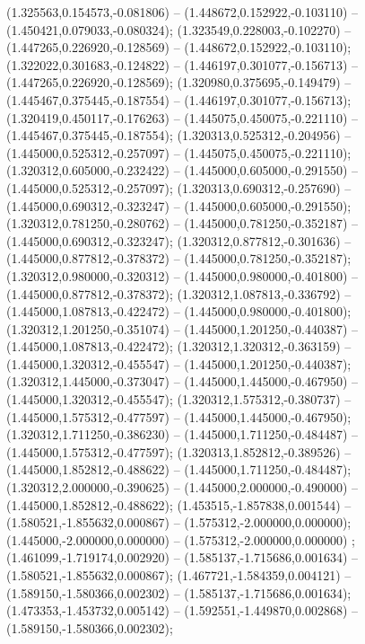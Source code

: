  (1.325563,0.154573,-0.081806) -- (1.448672,0.152922,-0.103110) -- (1.450421,0.079033,-0.080324);
 (1.323549,0.228003,-0.102270) -- (1.447265,0.226920,-0.128569) -- (1.448672,0.152922,-0.103110);
 (1.322022,0.301683,-0.124822) -- (1.446197,0.301077,-0.156713) -- (1.447265,0.226920,-0.128569);
 (1.320980,0.375695,-0.149479) -- (1.445467,0.375445,-0.187554) -- (1.446197,0.301077,-0.156713);
 (1.320419,0.450117,-0.176263) -- (1.445075,0.450075,-0.221110) -- (1.445467,0.375445,-0.187554);
 (1.320313,0.525312,-0.204956) -- (1.445000,0.525312,-0.257097) -- (1.445075,0.450075,-0.221110);
 (1.320312,0.605000,-0.232422) -- (1.445000,0.605000,-0.291550) -- (1.445000,0.525312,-0.257097);
 (1.320313,0.690312,-0.257690) -- (1.445000,0.690312,-0.323247) -- (1.445000,0.605000,-0.291550);
 (1.320312,0.781250,-0.280762) -- (1.445000,0.781250,-0.352187) -- (1.445000,0.690312,-0.323247);
 (1.320312,0.877812,-0.301636) -- (1.445000,0.877812,-0.378372) -- (1.445000,0.781250,-0.352187);
 (1.320312,0.980000,-0.320312) -- (1.445000,0.980000,-0.401800) -- (1.445000,0.877812,-0.378372);
 (1.320312,1.087813,-0.336792) -- (1.445000,1.087813,-0.422472) -- (1.445000,0.980000,-0.401800);
 (1.320312,1.201250,-0.351074) -- (1.445000,1.201250,-0.440387) -- (1.445000,1.087813,-0.422472);
 (1.320312,1.320312,-0.363159) -- (1.445000,1.320312,-0.455547) -- (1.445000,1.201250,-0.440387);
 (1.320312,1.445000,-0.373047) -- (1.445000,1.445000,-0.467950) -- (1.445000,1.320312,-0.455547);
 (1.320312,1.575312,-0.380737) -- (1.445000,1.575312,-0.477597) -- (1.445000,1.445000,-0.467950);
 (1.320312,1.711250,-0.386230) -- (1.445000,1.711250,-0.484487) -- (1.445000,1.575312,-0.477597);
 (1.320313,1.852812,-0.389526) -- (1.445000,1.852812,-0.488622) -- (1.445000,1.711250,-0.484487);
 (1.320312,2.000000,-0.390625) -- (1.445000,2.000000,-0.490000) -- (1.445000,1.852812,-0.488622);
 (1.453515,-1.857838,0.001544) -- (1.580521,-1.855632,0.000867) -- (1.575312,-2.000000,0.000000);
 (1.445000,-2.000000,0.000000) -- (1.575312,-2.000000,0.000000) ;
 (1.461099,-1.719174,0.002920) -- (1.585137,-1.715686,0.001634) -- (1.580521,-1.855632,0.000867);
 (1.467721,-1.584359,0.004121) -- (1.589150,-1.580366,0.002302) -- (1.585137,-1.715686,0.001634);
 (1.473353,-1.453732,0.005142) -- (1.592551,-1.449870,0.002868) -- (1.589150,-1.580366,0.002302);

